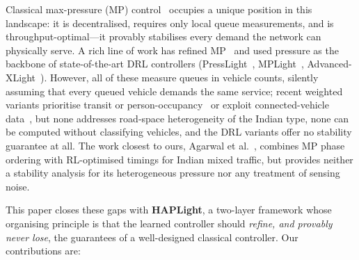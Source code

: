 \documentclass[journal]{IEEEtran}
\begin{document}
Classical max-pressure (MP) control~\cite{b_varaiya} occupies a unique
position in this landscape: it is decentralised, requires only local
queue measurements, and is throughput-optimal---it provably stabilises
every demand the network can physically serve. A rich line of work has
refined MP~\cite{b_lioris,b_anderson,b_levin,b_efficientmp} and used
pressure as the backbone of state-of-the-art DRL controllers
(PressLight~\cite{b_presslight}, MPLight~\cite{b_mplight},
Advanced-XLight~\cite{b_advxlight}). However, all of these measure
queues in vehicle counts, silently assuming that every queued vehicle
demands the same service; recent weighted variants prioritise transit or
person-occupancy~\cite{b_occmp} or exploit connected-vehicle
data~\cite{b_cvmp}, but none addresses road-space heterogeneity of the
Indian type, none can be computed without classifying vehicles, and the
DRL variants offer no stability guarantee at all. The work closest to
ours, Agarwal et al.~\cite{b_agarwal}, combines MP phase ordering with
RL-optimised timings for Indian mixed traffic, but provides neither a
stability analysis for its heterogeneous pressure nor any treatment of
sensing noise.

This paper closes these gaps with \textbf{HAPLight}, a two-layer
framework whose organising principle is that the learned controller
should \emph{refine, and provably never lose}, the guarantees of a
well-designed classical controller. Our contributions are:
\end{document}
